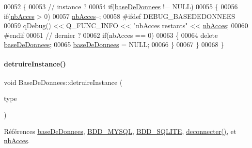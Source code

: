 \begin{DoxyCode}
00052 \{
00053     \textcolor{comment}{// instance ?}
00054     \textcolor{keywordflow}{if}(\hyperlink{class_base_de_donnees_a218c44b630523435e2f6f8f2f0c484f8}{baseDeDonnees} != NULL)
00055     \{
00056         \textcolor{keywordflow}{if}(\hyperlink{class_base_de_donnees_a5d2e5264c826c6600fd20a9831fd1782}{nbAcces} > 0)
00057             \hyperlink{class_base_de_donnees_a5d2e5264c826c6600fd20a9831fd1782}{nbAcces}--;
00058 \textcolor{preprocessor}{        #ifdef DEBUG\_BASEDEDONNEES}
00059         qDebug() << Q\_FUNC\_INFO << \textcolor{stringliteral}{"nbAcces restants"} << \hyperlink{class_base_de_donnees_a5d2e5264c826c6600fd20a9831fd1782}{nbAcces};
00060 \textcolor{preprocessor}{        #endif}
00061         \textcolor{comment}{// dernier ?}
00062         \textcolor{keywordflow}{if}(nbAcces == 0)
00063         \{
00064             \textcolor{keyword}{delete} \hyperlink{class_base_de_donnees_a218c44b630523435e2f6f8f2f0c484f8}{baseDeDonnees};
00065             \hyperlink{class_base_de_donnees_a218c44b630523435e2f6f8f2f0c484f8}{baseDeDonnees} = NULL;
00066         \}
00067     \}
00068 \}
\end{DoxyCode}
\mbox{\label{class_base_de_donnees_a5002dc7324ab6f82c607e2423709b806}} 
\paragraph{\texorpdfstring{detruire\+Instance()}{detruireInstance()}\hspace{0.1cm}{\footnotesize\ttfamily [2/2]}}
{\footnotesize\ttfamily void Base\+De\+Donnees\+::detruire\+Instance (\begin{DoxyParamCaption}\item[{Q\+String}]{type }\end{DoxyParamCaption})\hspace{0.3cm}{\ttfamily [static]}}



Références \hyperlink{class_base_de_donnees_a218c44b630523435e2f6f8f2f0c484f8}{base\+De\+Donnees}, \hyperlink{terminalmobile_2base_de_donnees_8h_aaf0ca062171227e6cb5722ad110fb783}{B\+D\+D\+\_\+\+M\+Y\+S\+QL}, \hyperlink{terminalmobile_2base_de_donnees_8h_a26d6b2af979a9747e911a07e64b2a954}{B\+D\+D\+\_\+\+S\+Q\+L\+I\+TE}, \hyperlink{class_base_de_donnees_ae780999d25a26a0e4dbe0706a4785978}{deconnecter()}, et \hyperlink{class_base_de_donnees_a5d2e5264c826c6600fd20a9831fd1782}{nb\+Acces}.


